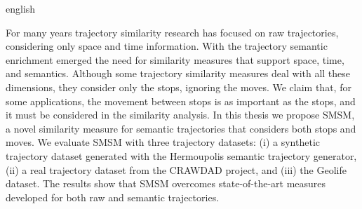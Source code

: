 \swapcontents
{
    \begin{otherlanguage*}{english}
    \begin{resumo}[Abstract]

        For many years trajectory similarity research has focused on raw trajectories, considering only space and time information. With the trajectory semantic enrichment emerged the need for similarity measures that support space, time, and semantics. Although some trajectory similarity measures deal with all these dimensions, they consider only the stops, ignoring the moves. We claim that, for some applications, the movement between stops is as important as the stops, and it must be considered in the similarity analysis.
        In this thesis we propose SMSM, a novel similarity measure for semantic trajectories that considers both stops and moves.
        We evaluate SMSM with three trajectory datasets: (i) a synthetic trajectory dataset generated with the Hermoupolis semantic trajectory generator, (ii) a real trajectory dataset from the CRAWDAD project, and (iii) the Geolife dataset. The results show that SMSM overcomes state-of-the-art measures developed for both raw and semantic trajectories.


    \end{resumo}
    \end{otherlanguage*}
}
